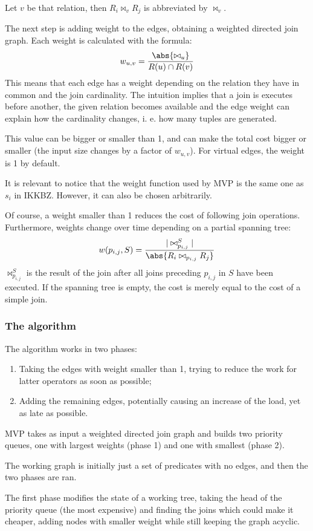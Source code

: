 Let $v$ be that relation, then $R_i \bowtie_v R_j$ is abbreviated by $\bowtie_v$.

The next step is adding weight to the edges, obtaining a weighted directed join graph. Each weight is calculated with the formula:
$$w_{u, v} = \frac{\abs{\bowtie_u}}{R(u) \cap R(v)}$$
This means that each edge has a weight depending on the relation they have in common and the join cardinality. The intuition implies that a join is executes before another, the given relation becomes available and the edge weight can explain how the cardinality changes, i. e. how many tuples are generated.

This value can be bigger or smaller than 1, and can make the total cost bigger or smaller (the input size changes by a factor of $w_{u, v}$). For virtual edges, the weight is 1 by default. 

It is relevant to notice that the weight function used by MVP is the same one as $s_i$ in IKKBZ. However, it can also be chosen arbitrarily.

Of course, a weight smaller than 1 reduces the cost of following join operations. Furthermore, weights change over time depending on a partial spanning tree: 
$$w(p_{i, j}, S) = \frac{|\bowtie_{p_{i, j}}^S|}{\abs{R_i \bowtie_{p_{i, j}} R_j}}$$
$\bowtie_{p_{i, j}}^S$ is the result of the join after all joins preceding $p_{i, j}$ in $S$ have been executed. If the spanning tree is empty, the cost is merely equal to the cost of a simple join. 

\subsubsection{The algorithm}
The algorithm works in two phases:
\begin{enumerate}
	\item Taking the edges with weight smaller than 1, trying to reduce the work for latter operators as soon as possible;
	\item Adding the remaining edges, potentially causing an increase of the load, yet as late as possible.
\end{enumerate}
MVP takes as input a weighted directed join graph and builds two priority queues, one with largest weights (phase 1) and one with smallest (phase 2). 

The working graph is initially just a set of predicates with no edges, and then the two phases are ran.

The first phase modifies the state of a working tree, taking the head of the priority queue (the most expensive) and finding the joins which could make it cheaper, adding nodes with smaller weight while still keeping the graph acyclic.

